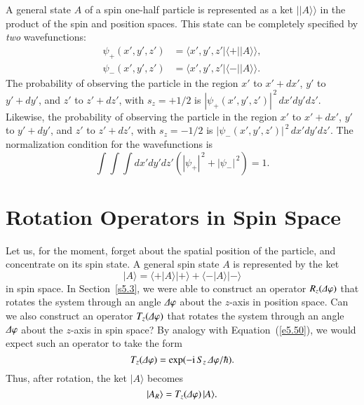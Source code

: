 A general state $A$ of a spin one-half particle is represented as a ket
$||A\rangle\rangle$ in the product  of the spin and position spaces. 
This state can be completely specified by {\em two}\/ wavefunctions:
\begin{align}
\psi_+(x', y', z') &= \langle x', y', z' |\langle +||A\rangle\rangle,\\[0.5ex]
\psi_-(x', y', z') &= \langle x', y', z' |\langle -||A\rangle\rangle.
\end{align}
The probability of observing the particle in the region $x'$ to $x'+dx'$,
$y'$ to $y'+dy'$, and $z'$ to $z'+dz'$, with $s_z = +1/2$ is
$|\psi_+ (x', y', z')|^{\,2}\,dx' dy' dz'$. Likewise, 
the probability of observing the particle in the region $x'$ to $x'+dx'$,
$y'$ to $y'+dy'$, and $z'$ to $z'+dz'$, with $s_z = -1/2$ is
$|\psi_- (x', y', z')|^{\,2}\,dx' dy' dz'$.
The normalization condition for the wavefunctions is
\begin{equation}
\int\!\int\!\int dx'dy'dz' \left(|\psi_+|^{\,2} + |\psi_-|^{\,2}\right)= 1.
\end{equation}

\section{Rotation Operators in Spin Space}\label{s5.9}
Let us, for the moment, forget about the spatial position of the particle,
and concentrate on its spin state. A general
spin state $A$ is represented by the ket
\begin{equation}\label{e5.115}
|A\rangle = \langle +|A\rangle |+\rangle + \langle -|A\rangle |-\rangle
\end{equation}
in spin space.
In Section~\ref{s5.3}, we were able  to construct an operator $R_z({\mit\Delta}\varphi)$ that 
rotates the system through an angle ${\mit\Delta}\varphi$ about the $z$-axis in position
space. Can we also construct an operator $T_z({\mit\Delta}\varphi)$ that rotates the
system through an angle ${\mit\Delta}\varphi$ about the $z$-axis in spin space? By analogy
with Equation~(\ref{e5.50}), we would expect such an operator to take the form
\begin{equation}\label{e5.116}
T_z({\mit\Delta}\varphi) = \exp(-{\rm i} \,S_z\, {\mit\Delta}\varphi/\hbar).
\end{equation}
Thus, after rotation, the ket $|A\rangle$ becomes
\begin{equation}
|A_R\rangle = T_z({\mit\Delta}\varphi)\, |A\rangle.
\end{equation}


